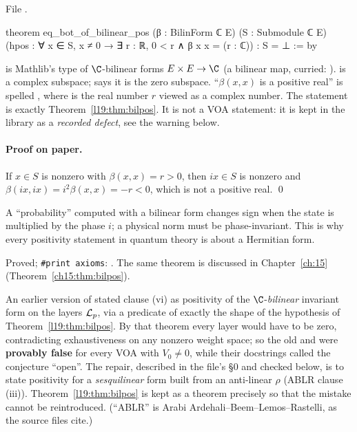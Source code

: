 \noindent File .
\begin{leancode}
theorem eq_bot_of_bilinear_pos (β : BilinForm ℂ E) (S : Submodule ℂ E)
    (hpos : ∀ x ∈ S, x ≠ 0 → ∃ r : ℝ, 0 < r ∧ β x x = (r : ℂ)) : S = ⊥ := by
\end{leancode}

\begin{dictionary}
 is Mathlib's type of $\C$-bilinear forms $E\times E\to\C$ (a bilinear map,
curried: ).  is a complex subspace;  says it is the zero
subspace. ``$\beta(x,x)$ is a positive real'' is spelled ,
where  is the real number $r$ viewed as a complex number. The statement is exactly
Theorem~\ref{l19:thm:bilpos}. It is not a VOA statement: it is kept in the library as a
\emph{recorded defect}, see the warning below.
\end{dictionary}

\paragraph{Proof on paper.} If $x\in S$ is nonzero with $\beta(x,x) = r>0$, then $ix\in S$ is
nonzero and $\beta(ix,ix) = i^2\beta(x,x) = -r<0$, which is not a positive real. \qed

\begin{physics}
A ``probability'' computed with a bilinear form changes sign when the state is multiplied by the
phase $i$; a physical norm must be phase-invariant. This is why every positivity statement in
quantum theory is about a Hermitian form.
\end{physics}

\begin{status}
Proved; \texttt{\#print axioms}: . The same theorem is
discussed in Chapter~\ref{ch:15} (Theorem~\ref{ch15:thm:bilpos}).
\end{status}

\begin{warning}[title={Recorded defect, now repaired: the old clause (vi) was false for every VOA}]\label{l19:warn:olddefect}
An earlier version of  stated clause (vi) as positivity
of the $\C$-\emph{bilinear} invariant form on the layers $\mathcal{L}_p$, via a predicate
 of exactly the shape of the hypothesis of
Theorem~\ref{l19:thm:bilpos}. By that theorem every layer would have to be zero, contradicting
exhaustiveness on any nonzero weight space; so the old  and
 were \textbf{provably false} for every VOA with $V_0\ne0$, while their
docstrings called the conjecture ``open''. The repair, described in the file's §0 and
checked below, is to state positivity for a \emph{sesquilinear} form built from an anti-linear
$\rho$ (ABLR clause (iii)). Theorem~\ref{l19:thm:bilpos} is kept as a theorem precisely so that the
mistake cannot be reintroduced. (``ABLR'' is Arabi Ardehali--Beem--Lemos--Rastelli, as the source files cite.)
\end{warning}

